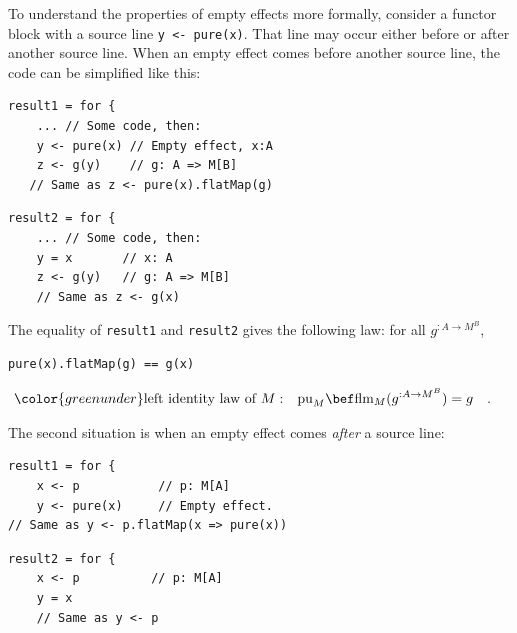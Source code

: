 To understand the properties of empty effects more formally, consider
a functor block with a source line \lstinline!y <- pure(x)!. That
line may occur either before or after another source line. When an
empty effect comes before another source line, the code can be simplified
like this:

\noindent \texttt{\textcolor{blue}{\footnotesize{}}}%
\begin{minipage}[c]{0.475\columnwidth}%
\texttt{\textcolor{blue}{\footnotesize{}}}
\begin{lstlisting}
result1 = for {
    ... // Some code, then:
    y <- pure(x) // Empty effect, x:A
    z <- g(y)    // g: A => M[B]
   // Same as z <- pure(x).flatMap(g)
\end{lstlisting}
%
\end{minipage}\texttt{\textcolor{blue}{\footnotesize{}\hspace*{\fill}}}%
\begin{minipage}[c]{0.475\columnwidth}%
\texttt{\textcolor{blue}{\footnotesize{}}}
\begin{lstlisting}
result2 = for {
    ... // Some code, then:
    y = x       // x: A
    z <- g(y)   // g: A => M[B]
    // Same as z <- g(x)
\end{lstlisting}
%
\end{minipage}{\footnotesize\par}

\noindent \vspace{0.1\baselineskip}
The equality of \lstinline!result1! and \lstinline!result2! gives
the following law: for all $g^{:A\rightarrow M^{B}}$,
\begin{lstlisting}
pure(x).flatMap(g) == g(x)
\end{lstlisting}
\begin{align}
{\color{greenunder}\text{left identity law of }M:}\quad & \text{pu}_{M}\bef\text{flm}_{M}(g^{:A\rightarrow M^{B}})=g\quad.\label{eq:monad-left-identity-law-for-flatMap}
\end{align}

The second situation is when an empty effect comes \emph{after} a
source line:

\noindent \texttt{\textcolor{blue}{\footnotesize{}}}%
\begin{minipage}[c]{0.475\columnwidth}%
\texttt{\textcolor{blue}{\footnotesize{}}}
\begin{lstlisting}
result1 = for {
    x <- p           // p: M[A]
    y <- pure(x)     // Empty effect.
// Same as y <- p.flatMap(x => pure(x))
\end{lstlisting}
%
\end{minipage}\texttt{\textcolor{blue}{\footnotesize{}\hspace*{\fill}}}%
\begin{minipage}[c]{0.475\columnwidth}%
\texttt{\textcolor{blue}{\footnotesize{}}}
\begin{lstlisting}
result2 = for {
    x <- p          // p: M[A]
    y = x
    // Same as y <- p
\end{lstlisting}
%
\end{minipage}{\footnotesize\par}

